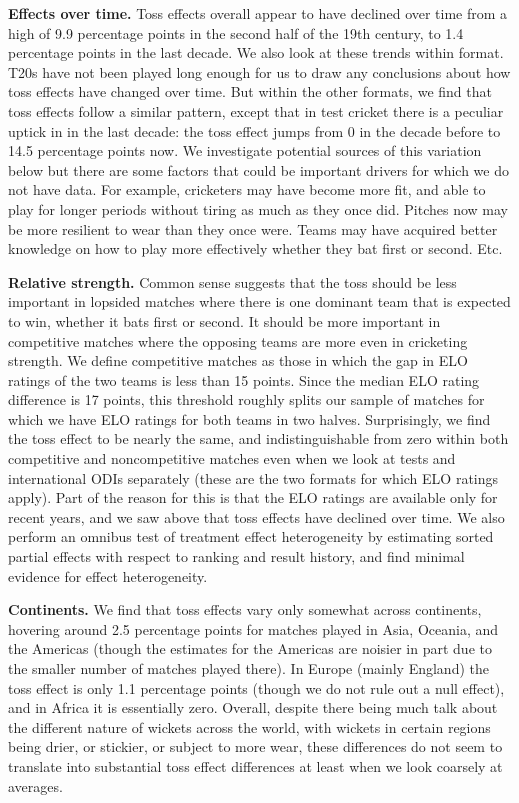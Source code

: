 \documentclass[11pt,  letterpaper]{article}
\begin{document}
\textbf{Effects over time.} Toss effects overall appear to have declined over time from a high of 9.9 percentage points in the second half of the 19th century, to 1.4 percentage points in the last decade. We also look at these trends within format. T20s have not been played long enough for us to draw any conclusions about how toss effects have changed over time. But within the other formats, we find that toss effects follow a similar pattern, except that in test cricket there is a peculiar uptick in in the last decade: the toss effect jumps from 0 in the decade before to 14.5 percentage points now.  We investigate potential sources of this variation below  but there are some factors that could be important drivers for which we do not have data. For example, cricketers may have become more fit, and able to play for longer periods without tiring as much as they once did. Pitches now may be more resilient to wear than they once were. Teams may have acquired better knowledge on how to play more effectively whether they bat first or second. Etc.

\textbf{Relative strength.} Common sense suggests that the toss should be less important in lopsided matches where there is one dominant team that is expected to win, whether it bats first or second. It should be more important in competitive matches where the opposing teams are more even in cricketing strength. We define competitive matches as those in which the gap in ELO ratings of the two teams is less than 15 points. Since the median ELO rating difference is 17 points, this threshold roughly splits our sample of matches for which we have ELO ratings for both teams in two halves. Surprisingly, we find the toss effect to be nearly the same, and indistinguishable from zero within both competitive and noncompetitive matches even when we look at tests and international ODIs separately (these are the two formats for which ELO ratings apply). Part of the reason for this is that the ELO ratings are available only for recent years, and we saw above that toss effects have declined over time. We also perform an omnibus test of treatment effect heterogeneity by estimating sorted partial effects \citep{chernozhukov2018sorted,chen2019sortedeffects} with respect to ranking and result history, and find minimal evidence for effect heterogeneity. 

\textbf{Continents.} We find that toss effects vary only somewhat across continents, hovering around 2.5 percentage points for matches played in Asia, Oceania, and the Americas (though the estimates for the Americas are noisier in part due to the smaller number of matches played there). In Europe (mainly England) the toss effect is only 1.1 percentage points (though we do not rule out a null effect), and in Africa it is essentially zero. Overall, despite there being much talk about the different nature of wickets across the world, with wickets in certain regions being drier, or stickier, or subject to more wear, these differences do not seem to translate into substantial toss effect differences at least when we look coarsely at averages.
\end{document}
